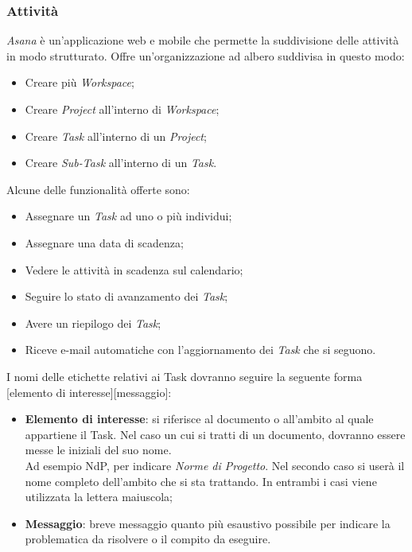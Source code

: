 \documentclass[12pt,a4paper,titlepage]{article}
\begin{document}
\subsubsection{Attività}
\textit{Asana} è un'applicazione web e mobile che permette la suddivisione delle attività in modo
strutturato. Offre un'organizzazione ad albero suddivisa in questo modo:
\begin{itemize}
	\item Creare più \textit{Workspace};
	\item Creare \textit{Project} all'interno di \textit{Workspace};
	\item Creare \textit{Task} all'interno di un \textit{Project};
	\item Creare \textit{Sub-Task} all'interno di un \textit{Task}.
\end{itemize}
Alcune delle funzionalità offerte sono:
\begin{itemize}
	\item Assegnare un \textit{Task} ad uno o più individui;
	\item Assegnare una data di scadenza;
	\item Vedere le attività in scadenza sul calendario;
	\item Seguire lo stato di avanzamento dei \textit{Task};
	\item Avere un riepilogo dei \textit{Task};
	\item Riceve e-mail automatiche con l'aggiornamento dei \textit{Task} che si seguono.
\end{itemize}
I nomi delle etichette relativi ai Task dovranno seguire la seguente forma [elemento di interesse][messaggio]:
\begin{itemize}
	\item \textbf{Elemento di interesse}: si riferisce al documento o all'ambito al quale appartiene 
	il Task. Nel caso un cui si tratti di un documento, dovranno essere messe le iniziali del suo nome.\\
	Ad esempio NdP, per indicare \textit{Norme di Progetto}. Nel secondo caso si userà il nome completo dell'ambito
	che si sta trattando. In entrambi i casi viene utilizzata la lettera maiuscola;
	\item \textbf{Messaggio}: breve messaggio quanto più esaustivo possibile per indicare la problematica da risolvere o il compito da eseguire.
\end{itemize}
\end{document}

